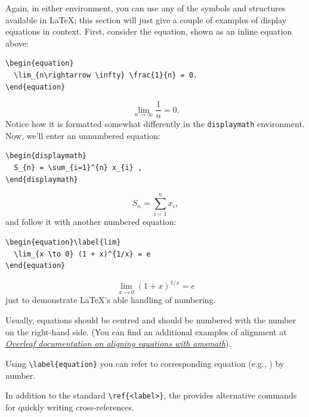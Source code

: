 \documentclass[a4paper]{jpconf}
\begin{document}
Again, in either environment, you can use any of the symbols and
structures available in \LaTeX{}; this section will just give a couple
of examples of display equations in context.  First, consider the
equation, shown as an inline equation above:
\begin{verbatim}
\begin{equation}
  \lim_{n\rightarrow \infty} \frac{1}{n} = 0.
\end{equation}
\end{verbatim}
\begin{equation}
  \lim_{n\rightarrow \infty} \frac{1}{n} = 0.
\end{equation}
Notice how it is formatted somewhat differently in
the \verb|displaymath|
environment.  Now, we'll enter an unnumbered equation:
\begin{verbatim}
\begin{displaymath}
  S_{n} = \sum_{i=1}^{n} x_{i} ,
\end{displaymath}
\end{verbatim}
\begin{displaymath}
  S_{n} = \sum_{i=1}^{n} x_{i} ,
\end{displaymath}
and follow it with another numbered equation:
\begin{verbatim}
\begin{equation}\label{lim}
  \lim_{x \to 0} (1 + x)^{1/x} = e
\end{equation}
\end{verbatim}
\begin{equation}\label{lim}
\lim_{x \to 0} (1 + x)^{1/x} = e
\end{equation}
just to demonstrate \LaTeX's able handling of numbering.

Usually, equations should be centred and should be numbered with the number on the right-hand side. (You can find an additional examples of alignment at \href{https://www.overleaf.com/learn/latex/Aligning_equations_with_amsmath}{\textit{Overleaf documentation on aligning equations with amsmath}}). 

Using \verb|\label{equation}| you can refer to corresponding equation (e.g., ) by number.

In addition to the standard \verb"\ref{<label>}", the  provides alternative commands for quickly writing cross-references.
\end{document}
